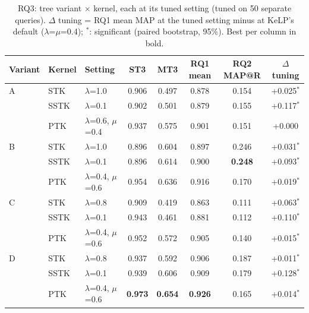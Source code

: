 \begin{table}[t]
\centering
\caption{RQ3: tree variant $\times$ kernel, each at its tuned setting (tuned on 50 separate queries). $\Delta$ tuning = RQ1 mean MAP at the tuned setting minus at KeLP's default ($\lambda$=$\mu$=0.4); $^{*}$: significant (paired bootstrap, 95\%). Best per column in bold.}
\label{tab:rq3}
\small
\begin{tabular}{lllccccc}
\toprule
Variant & Kernel & Setting & ST3 & MT3 & RQ1 mean & RQ2 MAP@R & $\Delta$ tuning \\
\midrule
A & STK & $\lambda$=1.0 & 0.906 & 0.497 & 0.878 & 0.154 & +0.025$^{*}$ \\
 & SSTK & $\lambda$=0.1 & 0.902 & 0.501 & 0.879 & 0.155 & +0.117$^{*}$ \\
 & PTK & $\lambda$=0.6, $\mu$=0.4 & 0.937 & 0.575 & 0.901 & 0.151 & +0.000 \\
\midrule
B & STK & $\lambda$=1.0 & 0.896 & 0.604 & 0.897 & 0.246 & +0.031$^{*}$ \\
 & SSTK & $\lambda$=0.1 & 0.896 & 0.614 & 0.900 & \textbf{0.248} & +0.093$^{*}$ \\
 & PTK & $\lambda$=0.4, $\mu$=0.6 & 0.954 & 0.636 & 0.916 & 0.170 & +0.019$^{*}$ \\
\midrule
C & STK & $\lambda$=0.8 & 0.909 & 0.419 & 0.863 & 0.111 & +0.063$^{*}$ \\
 & SSTK & $\lambda$=0.1 & 0.943 & 0.461 & 0.881 & 0.112 & +0.110$^{*}$ \\
 & PTK & $\lambda$=0.4, $\mu$=0.6 & 0.952 & 0.572 & 0.905 & 0.140 & +0.015$^{*}$ \\
\midrule
D & STK & $\lambda$=0.8 & 0.937 & 0.592 & 0.906 & 0.187 & +0.011$^{*}$ \\
 & SSTK & $\lambda$=0.1 & 0.939 & 0.606 & 0.909 & 0.179 & +0.128$^{*}$ \\
 & PTK & $\lambda$=0.4, $\mu$=0.6 & \textbf{0.973} & \textbf{0.654} & \textbf{0.926} & 0.165 & +0.014$^{*}$ \\
\bottomrule
\end{tabular}
\end{table}
